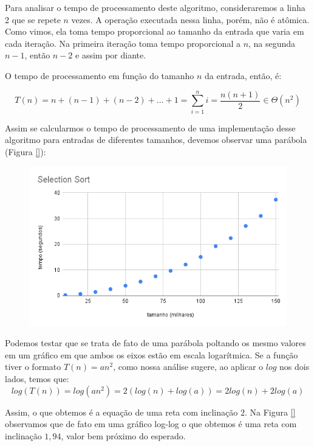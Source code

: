   Para analisar o tempo de processamento deste algoritmo, consideraremos a linha 2 que se repete $n$ vezes.
  A operação executada nessa linha, porém, não é atômica.
  Como vimos, ela toma tempo proporcional ao tamanho da entrada que varia em cada iteração.
  Na primeira iteração toma tempo proporcional a $n$, na segunda $n-1$, então $n-2$ e assim por diante.

  O tempo de processamento em função do tamanho $n$ da entrada, então, é:

  \begin{displaymath}
    T(n) = n + (n-1) + (n-2) + \dots + 1 = \sum_{i=1}^{n}i = \frac{n(n+1)}{2} \in \Theta(n^2)
  \end{displaymath}

  Assim se calcularmos o tempo de processamento de uma implementação desse algoritmo para entradas de diferentes tamanhos, devemos observar uma parábola (Figura \ref{}):

  \begin{figure}
    \includegraphics[width=\textwidth]{imagens/SelectionSort1.png}
  \end{figure}

  Podemos testar que se trata de fato de uma parábola poltando os mesmo valores em um gráfico em que ambos os eixos estão em escala logarítmica.
  Se a função tiver o formato $T(n) = an^2$, como nossa análise sugere, ao aplicar o $log$ nos dois lados, temos que:
  \begin{displaymath}
  log(T(n)) = log(an^2) = 2(log(n) + log(a)) = 2log(n) + 2log(a)
  \end{displaymath}
  
  Assim, o que obtemos é a equação de uma reta com inclinação $2$.
  Na Figura \ref{} observamos que de fato em uma gráfico log-log o que obtemos é uma reta com inclinação $1,94$, valor bem próximo do esperado.

